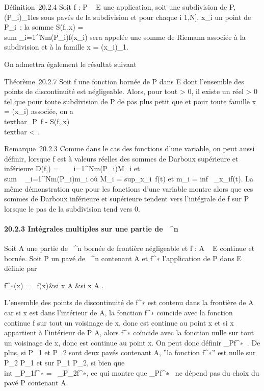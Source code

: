 \documentclass[]{article}
\begin{document}
Définition~20.2.4 Soit f : P \rightarrow~ E une application, soit \sigma une subdivision
de P, (P\_i)\_1\leqi\leqN les sous pavés de la subdivision et
pour chaque i \in {[}1,N{]}, x\_i un point de P\_i~; la
somme S(f,\sigma,x) =\ \\sum
 \_i=1^Nm(P\_i)f(x\_i) sera appelée une
somme de Riemann associée à la subdivision \sigma et à la famille x =
(x\_i)\_1\leqi\leqN.

On admettra également le résultat suivant

Théorème~20.2.7 Soit f une fonction bornée de P dans E dont l'ensemble
des points de discontinuité est négligeable. Alors, pour tout \epsilon
\textgreater{} 0, il existe un réel \eta \textgreater{} 0 tel que pour
toute subdivision \sigma de P de pas plus petit que \eta et pour toute famille x
= (x\_i) associée, on a
\\textbar{}\int  \_P~f -
S(f,\sigma,x)\\textbar{} \textless{} \epsilon.

Remarque~20.2.3 Comme dans le cas des fonctions d'une variable, on peut
aussi définir, lorsque f est à valeurs réelles des sommes de Darboux
supérieure et inférieure D(f,\sigma) =\
\sum ~
\_i=1^Nm(P\_i)M\_i et
\\sum ~
\_i=1^Nm(P\_i)m\_i où M\_i
= sup\_x\inP\_i~f(t) et
m\_i = inf~
\_x\inP\_if(t). La même démonstration que pour les fonctions
d'une variable montre alors que ces sommes de Darboux inférieure et
supérieure tendent vers l'intégrale de f sur P lorsque le pas de la
subdivision tend vers 0.

\paragraph{20.2.3 Intégrales multiples sur une partie de ~^n}

Soit A une partie de ~^n bornée de frontière négligeable et f
: A \rightarrow~ E continue et bornée. Soit P un pavé de \mathbb{R}~^n contenant A
et f^∗ l'application de P dans E définie par

 f^∗(x) = \left \
\cases f(x)&si x \in A  &si x \in A
 \right .

L'ensemble des points de discontinuité de f^∗ est contenu
dans la frontière de A car si x est dans l'intérieur de A, la fonction
f^∗ coïncide avec la fonction continue f sur tout un
voisinage de x, donc est continue au point x et si x appartient à
l'intérieur de P \diagdown A, alors f^∗ coïncide avec la fonction
nulle sur tout un voisinage de x, donc est continue au point x. On peut
donc définir \int  \_Pf^∗~. De
plus, si P\_1 et P\_2 sont deux pavés contenant A, ''la
fonction f^∗'' est nulle sur P\_2 \diagdown P\_1 et
sur P\_1 \diagdown P\_2, si bien que \\int
 \_P\_1f^∗ =\int ~
\_P\_2f^∗, ce qui montre que
\int  \_Pf^∗~ ne dépend pas du
choix du pavé P contenant A.
\end{document}
